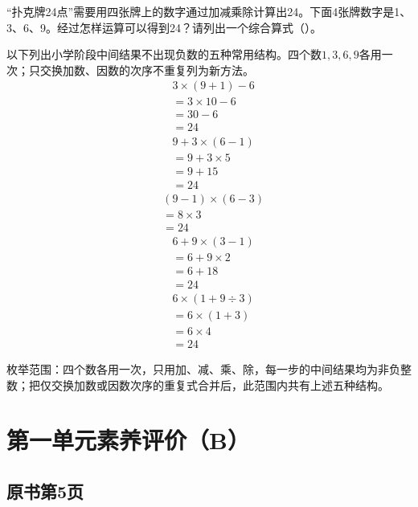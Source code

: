 “扑克牌24点”需要用四张牌上的数字通过加减乘除计算出24。下面4张牌数字是1、3、6、9。经过怎样运算可以得到24？请列出一个综合算式（\hspace{1.8em}）。\par
{}
\begin{BookAnswer}
以下列出小学阶段中间结果不出现负数的五种常用结构。四个数\(1,3,6,9\)各用一次；只交换加数、因数的次序不重复列为新方法。\[\begin{aligned}&3\times(9+1)-6\\&=3\times10-6\\&=30-6\\&=24\end{aligned}\]\[\begin{aligned}&9+3\times(6-1)\\&=9+3\times5\\&=9+15\\&=24\end{aligned}\]\[\begin{aligned}&(9-1)\times(6-3)\\&=8\times3\\&=24\end{aligned}\]\[\begin{aligned}&6+9\times(3-1)\\&=6+9\times2\\&=6+18\\&=24\end{aligned}\]\[\begin{aligned}&6\times(1+9\div3)\\&=6\times(1+3)\\&=6\times4\\&=24\end{aligned}\]\par 枚举范围：四个数各用一次，只用加、减、乘、除，每一步的中间结果均为非负整数；把仅交换加数或因数次序的重复式合并后，此范围内共有上述五种结构。
\end{BookAnswer}


\section{第一单元素养评价（B）}



\subsection*{原书第5页}

